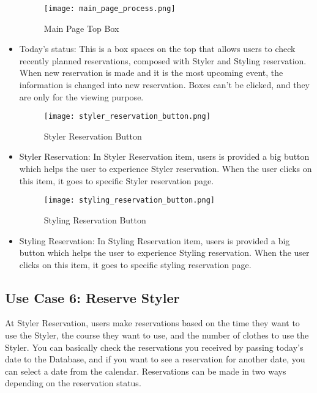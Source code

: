 \documentclass[conference]{IEEEtran}
\begin{document}
\begin{itemize}
    \begin{figure}[htbp]
    \centerline{\texttt{[image: main\_page\_process.png]}}
    \label{fig}
    \caption{Main Page Top Box}
    \end{figure}
    \item Today’s status: This is a box spaces on the top that allows users to check recently planned reservations, composed with Styler and Styling reservation. When new reservation is made and it is the most upcoming event, the information is changed into new reservation. Boxes can’t be clicked, and they are only for the viewing purpose.\\

     \begin{figure}[htbp]
    \centerline{\texttt{[image: styler\_reservation\_button.png]}}
    \label{fig}
    \caption{Styler Reservation Button}
    \end{figure}
    \item Styler Reservation: In Styler Reservation item, users is provided a big button which helps the user to experience Styler reservation. When the user clicks on this item, it goes to specific Styler reservation page.\\
    
    \begin{figure}[htbp]
    \centerline{\texttt{[image: styling\_reservation\_button.png]}}
    \label{fig}
    \caption{Styling Reservation Button}
    \end{figure}
    \item Styling Reservation: In Styling Reservation item, users is provided a big button which helps the user to experience Styling reservation. When the user clicks on this item, it goes to specific styling reservation page.\\
\end{itemize}

\subsection{Use Case 6: Reserve Styler}
At Styler Reservation, users make reservations based on the time they want to use the Styler, the course they want to use, and the number of clothes to use the Styler. You can basically check the reservations you received by passing today's date to the Database, and if you want to see a reservation for another date, you can select a date from the calendar. Reservations can be made in two ways depending on the reservation status.\\
\end{document}

